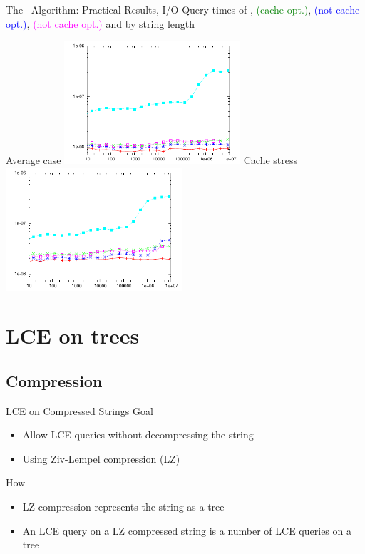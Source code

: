 \documentclass{beamer}
\begin{document}
\begin{frame}{The \fprintk\ Algorithm: Practical Results, I/O}
    Query times of
    \textcolor{red}{},
    \textcolor{green}{\fprint[2] (cache opt.)},
    \textcolor{blue}{\fprint[3] (not cache opt.)},
    \textcolor{magenta}{\fprint[\logceil] (not cache opt.)} and
    \textcolor{cyan}{}
    by string length
    \begin{multicols}{2}{
        \begin{center}
            Average case
            \includegraphics[width=0.49\textwidth,type=pdf,ext=.pdf,read=.pdf]{../src/results/length-slides-cache-rand10.plt}
            \newpage
            Cache stress\\
            \includegraphics[width=0.49\textwidth,type=pdf,ext=.pdf,read=.pdf]{../src/results/length-slides-cache-rand2.plt}
        \end{center}
    }
    \end{multicols}
\end {frame}

\section{LCE on trees}
\subsection{Compression}
\begin{frame}{LCE on Compressed Strings}
    Goal
    \begin{itemize}
        \item Allow LCE queries without decompressing the string
        \item Using Ziv-Lempel compression (LZ)
    \end{itemize}
    How
    \begin{itemize}
        \item LZ compression represents the string as a tree
        \item An LCE query on a LZ compressed string is a number of LCE queries on a tree
    \end{itemize}
\end{frame}
\end{document}
